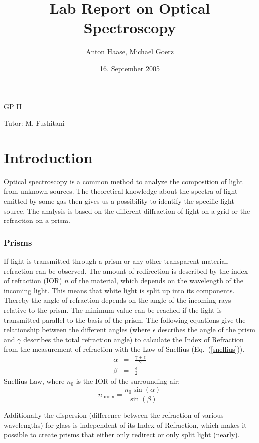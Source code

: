 \documentclass[a4paper,10pt]{article}
\title{Lab Report on Optical Spectroscopy}
\author{Anton Haase, Michael Goerz}
\date{16. September 2005}
\begin{document}
\maketitle
\noindent GP II

\noindent Tutor: M. Fushitani

\section{Introduction}
Optical spectroscopy is a common method to analyze the composition of light from unknown sources. The theoretical knowledge about the spectra of light emitted by some gas then gives us a possibility to identify the specific light source. The analysis is based on the different diffraction of light on a grid or the refraction on a prism.

\subsubsection*{Prisms}
If light is transmitted through a prism or any other transparent material, refraction can be observed. The amount of redirection is described by the index of refraction (IOR) $n$ of the material, which depends on the wavelength of the incoming light. This means that white light is split up into its components. Thereby the angle of refraction depends on the angle of the incoming rays relative to the prism. The minimum value can be reached if the light is transmitted parallel to the basis of the prism. The following equations give the relationship between the different angles (where $\epsilon$ describes the angle of the prism and $\gamma$ describes the total refraction angle) to calculate the Index of Refraction from the measurement of refraction with the Law of Snellius (Eq.~(\ref{snellius})).
\begin{eqnarray}
\alpha &=& \frac{\gamma + \epsilon}{2} \\
\beta &=& \frac{\epsilon}{2}
\end{eqnarray}
Snellius Law, where $n_0$ is the IOR of the surrounding air:
\begin{equation}
n_\text{prism} = \frac{n_0 \sin(\alpha)}{\sin(\beta)} \label{snellius}
\end{equation}

Additionally the dispersion (difference between the refraction of various wavelengths) for glass is independent of its Index of Refraction, which makes it possible to create prisms that either only redirect or only split light (nearly).
\end{document}
